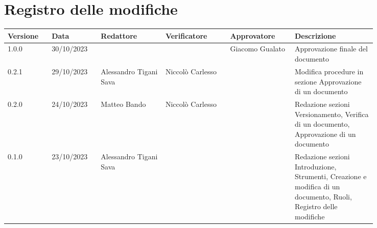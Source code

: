 \section*{Registro delle modifiche}
{
\renewcommand{\arraystretch}{1.5}
\scriptsize
\begin{tabular}{p{0.10\linewidth}p{0.10\linewidth}p{0.15\linewidth}p{0.15\linewidth}p{0.15\linewidth}p{0.19\linewidth}}
    \textbf{Versione}   & \textbf{Data} & \textbf{Redattore}        & \textbf{Verificatore} & \textbf{Approvatore}  & \textbf{Descrizione}  \\
    \hline
    1.0.0               & 30/10/2023    &                           &                       & Giacomo Gualato       & Approvazione finale del documento \\
    \hline
    0.2.1               & 29/10/2023    & Alessandro Tigani Sava           & Niccolò Carlesso      &                       & Modifica procedure in sezione Approvazione di un documento \\
    \hline
    0.2.0               & 24/10/2023    & Matteo Bando              & Niccolò Carlesso      &                       & Redazione sezioni Versionamento, Verifica di un documento, Approvazione di un documento   \\
    \hline
    0.1.0               & 23/10/2023    & Alessandro Tigani Sava    &                       &                       & Redazione sezioni Introduzione, Strumenti, Creazione e modifica di un documento, Ruoli, Registro delle modifiche \\
    \hline
\end{tabular}
}